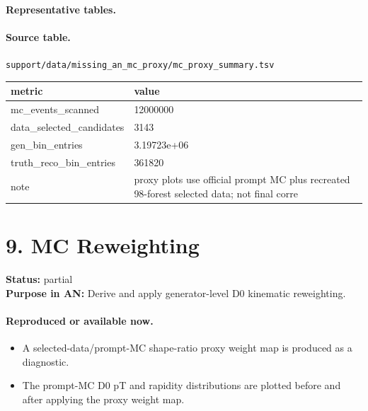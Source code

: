 \documentclass[11pt]{article}
\begin{document}
\paragraph{Representative tables.}
\paragraph{Source table.} \texttt{support/data/missing\_an\_mc\_proxy/mc\_proxy\_summary.tsv}
\begin{center}\scriptsize
\begin{tabular}{|l|l|}
\hline
metric & value \\ \hline
mc\_events\_scanned & 12000000 \\ \hline
data\_selected\_candidates & 3143 \\ \hline
gen\_bin\_entries & 3.19723e+06 \\ \hline
truth\_reco\_bin\_entries & 361820 \\ \hline
note & proxy plots use official prompt MC plus recreated 98-forest selected data; not final corre \\ \hline
\end{tabular}
\end{center}
\section*{9. MC Reweighting}
\textbf{Status:} partial\\
\textbf{Purpose in AN:} Derive and apply generator-level D0 kinematic reweighting.
\paragraph{Reproduced or available now.}
\begin{itemize}
\item A selected-data/prompt-MC shape-ratio proxy weight map is produced as a diagnostic.
\item The prompt-MC D0 pT and rapidity distributions are plotted before and after applying the proxy weight map.
\end{itemize}
\end{document}
